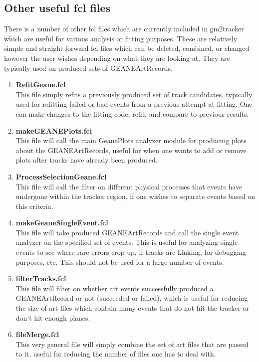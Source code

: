 \documentclass{article}
\begin{document}
  \subsection{Other useful fcl files}

    There is a number of other fcl files which are currently included in gm2tracker which are useful for various analysis or fitting purposes. These are relatively simple and straight forward fcl files which can be deleted, combined, or changed however the user wishes depending on what they are looking at. They are typically used on produced sets of GEANEArtRecords.

    \begin{enumerate}

      \item{\bf{RefitGeane.fcl}} \\
      This file simply refits a previously produced set of track candidates, typically used for refitting failed or bad events from a previous attempt at fitting. One can make changes to the fitting code, refit, and compare to previous results.

      \item{\bf{makeGEANEPlots.fcl}} \\
      This file will call the main GeanePlots analyzer module for producing plots about the GEANEArtRecords, useful for when one wants to add or remove plots after tracks have already been produced.

      \item{\bf{ProcessSelectionGeane.fcl}} \\
      This file will call the filter on different physical processes that events have undergone within the tracker region, if one wishes to separate events based on this criteria.

      \item{\bf{makeGeaneSingleEvent.fcl}} \\
      This file will take produced GEANEArtRecords and call the single event analyzer on the specified set of events. This is useful for analyzing single events to see where rare errors crop up, if tracks are kinking, for debugging purposes, etc. This should not be used for a large number of events.

      \item{\bf{filterTracks.fcl}} \\
      This file will filter on whether art events successfully produced a GEANEArtRecord or not (succeeded or failed), which is useful for reducing the size of art files which contain many events that do not hit the tracker or don't hit enough planes.

      \item{\bf{fileMerge.fcl}} \\
      This very general file will simply combine the set of art files that are passed to it, useful for reducing the number of files one has to deal with.

    \end{enumerate}
\end{document}
